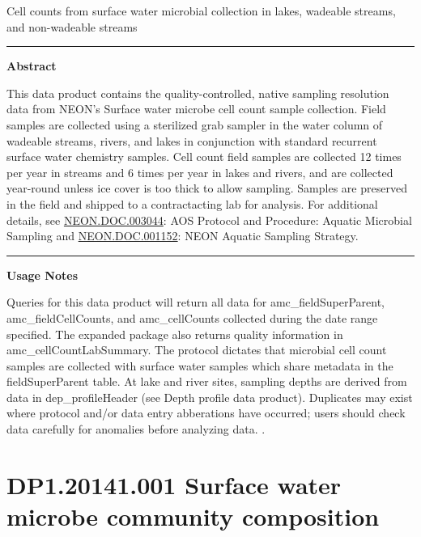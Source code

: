 \documentclass[]{article}
\begin{document}
Cell counts from surface water microbial collection in lakes, wadeable
streams, and non-wadeable streams

\begin{center}\rule{0.5\linewidth}{\linethickness}\end{center}

\textbf{Abstract}

This data product contains the quality-controlled, native sampling
resolution data from NEON's Surface water microbe cell count sample
collection. Field samples are collected using a sterilized grab sampler
in the water column of wadeable streams, rivers, and lakes in
conjunction with standard recurrent surface water chemistry samples.
Cell count field samples are collected 12 times per year in streams and
6 times per year in lakes and rivers, and are collected year-round
unless ice cover is too thick to allow sampling. Samples are preserved
in the field and shipped to a contractacting lab for analysis. For
additional details, see
\href{http://data.neonscience.org/api/v0/documents/NEON.DOC.003044vB}{NEON.DOC.003044}:
AOS Protocol and Procedure: Aquatic Microbial Sampling and
\href{http://data.neonscience.org/api/v0/documents/NEON.DOC.001152vA}{NEON.DOC.001152}:
NEON Aquatic Sampling Strategy.

\begin{center}\rule{0.5\linewidth}{\linethickness}\end{center}

\textbf{Usage Notes}

Queries for this data product will return all data for
amc\_fieldSuperParent, amc\_fieldCellCounts, and amc\_cellCounts
collected during the date range specified. The expanded package also
returns quality information in amc\_cellCountLabSummary. The protocol
dictates that microbial cell count samples are collected with surface
water samples which share metadata in the fieldSuperParent table. At
lake and river sites, sampling depths are derived from data in
dep\_profileHeader (see Depth profile data product). Duplicates may
exist where protocol and/or data entry abberations have occurred; users
should check data carefully for anomalies before analyzing data.
\newpage
.

\section{DP1.20141.001 Surface water microbe community
composition}\label{dp1.20141.001-surface-water-microbe-community-composition}
\end{document}
